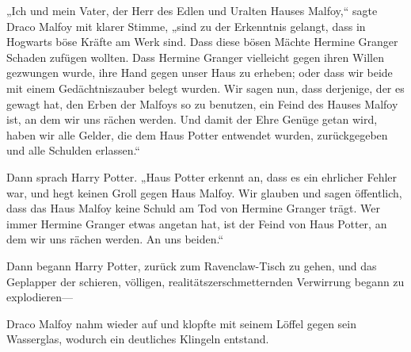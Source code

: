 „Ich und mein Vater, der Herr des Edlen und Uralten Hauses Malfoy,“ sagte Draco Malfoy mit klarer Stimme, „sind zu der Erkenntnis gelangt, dass in Hogwarts böse Kräfte am Werk sind. Dass diese bösen Mächte Hermine Granger Schaden zufügen wollten. Dass Hermine Granger vielleicht gegen ihren Willen gezwungen wurde, ihre Hand gegen unser Haus zu erheben; oder dass wir beide mit einem Gedächtniszauber belegt wurden. Wir sagen nun, dass derjenige, der es gewagt hat, den Erben der Malfoys so zu benutzen, ein Feind des Hauses Malfoy ist, an dem wir uns rächen werden. Und damit der Ehre Genüge getan wird, haben wir alle Gelder, die dem Haus Potter entwendet wurden, zurückgegeben und alle Schulden erlassen.“

Dann sprach Harry Potter.
„Haus Potter erkennt an, dass es ein ehrlicher Fehler war, und hegt keinen Groll gegen Haus Malfoy. Wir glauben und sagen öffentlich, dass das Haus Malfoy keine Schuld am Tod von Hermine Granger trägt. Wer immer Hermine Granger etwas angetan hat, ist der Feind von Haus Potter, an dem wir uns rächen werden. An uns beiden.“

Dann begann Harry Potter, zurück zum Ravenclaw-Tisch zu gehen, und das Geplapper der schieren, völligen, realitätszerschmetternden Verwirrung begann zu explodieren—

Draco Malfoy nahm wieder auf und klopfte mit seinem Löffel gegen sein Wasserglas, wodurch ein deutliches Klingeln entstand.

